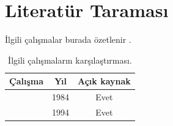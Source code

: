 \chapter{Literatür Taraması}
\label{chap:literatur}

İlgili çalışmalar burada özetlenir \parencite{biblatex,latexmk}.

\begin{table}[htbp]
  \centering
  \caption{İlgili çalışmaların karşılaştırması.}
  \label{tab:karsilastirma}
  \begin{tabular}{lcc}
    \toprule
    Çalışma                     & Yıl  & Açık kaynak \\
    \midrule
    \textcite{knuth1984texbook} & 1984 & Evet        \\
    \textcite{lamport1994latex} & 1994 & Evet        \\
    \bottomrule
  \end{tabular}
\end{table}
